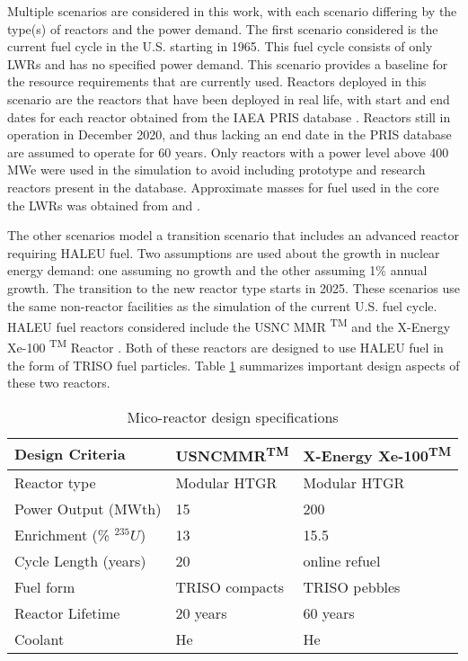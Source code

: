 Multiple scenarios are considered in this work, with each scenario differing
by the type(s) of reactors and the power demand. The first scenario considered 
is the current fuel cycle in the U.S. starting in 1965. This fuel cycle 
consists of only \gls{LWR}s
and has no specified power demand. This scenario provides a baseline for 
the resource requirements that are currently used. Reactors deployed in this 
scenario are the reactors that have been deployed in real life, with start and 
end dates for each reactor obtained from the \gls{IAEA} \gls{PRIS} database 
\cite{noauthor_power_1989}. Reactors still in operation in December 2020, and thus 
lacking an end date in the \gls{PRIS} database are assumed to operate for 60 
years. Only reactors with a power level above 400 MWe were used in the simulation 
to avoid including prototype and research reactors present in the database. 
Approximate masses for fuel used in the core the \gls{LWR}s was obtained 
from \cite{todreas_nuclear_2012} and \cite{cacuci_handbook_2010}. 

The other scenarios model a transition scenario that includes an advanced 
reactor requiring \gls{HALEU} fuel. Two assumptions are used about the growth 
in nuclear energy demand: one assuming no growth and the other assuming 
1\% annual growth. The transition to the new reactor type starts in 2025. 
These scenarios use the same  
non-reactor facilities as the simulation of the current 
U.S. fuel cycle. \gls{HALEU} fuel reactors 
considered include the \gls{USNC} \gls{MMR} \textsuperscript{TM}
\cite{mitchell_usnc_2020} and the X-Energy Xe-100 \textsuperscript{TM} 
Reactor \cite{harlan_x-energy_2018}\cite{hussain_advances_2018}. Both of 
these reactors are designed 
to use \gls{HALEU} fuel in the form of \gls{TRISO} fuel particles. Table 
\ref{tab:reactor_summary} summarizes important design aspects of these two reactors.

\begin{table}[ht]
    \caption{Mico-reactor design specifications}
    \label{tab:reactor_summary}
    \begin{tabular}{p{2.5cm}p{2.25cm}p{2.5cm}}
        \hline
        Design Criteria & \gls{USNC}\gls{MMR}\textsuperscript{TM} & 
            X-Energy Xe-100\textsuperscript{TM} \\\hline
        Reactor type & Modular HTGR & Modular HTGR \\
        Power Output (MWth) & 15 & 200 \\
        Enrichment (\% $^{235}U$) & 13 & 15.5 \\
        Cycle Length (years) & 20 & online refuel\\
        Fuel form & \gls{TRISO} compacts & \gls{TRISO} pebbles\\
        Reactor Lifetime & 20 years & 60 years \\
        Coolant & He & He \\
        \hline
    \end{tabular}
\end{table}
    
